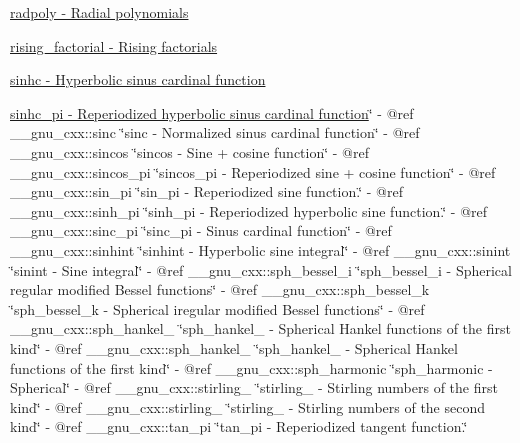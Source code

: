 \begin{DoxyItemize}
\item \hyperlink{group__gnu__math__spec__func_gac44ad9bda660a21a6b297d313f0ecf48}{radpoly -\/ Radial polynomials}
\item \hyperlink{group__gnu__math__spec__func_gad9410c6f678c673542d1b6243759ae05}{rising\+\_\+factorial -\/ Rising factorials}
\item \hyperlink{group__gnu__math__spec__func_gabafa26d8a2e592a0e080beae71ccbb7e}{sinhc -\/ Hyperbolic sinus cardinal function}
\item \hyperlink{group__gnu__math__spec__func_ga56bea42a4701761e82567f7100d9ca5e}{sinhc\+\_\+pi -\/ Reperiodized hyperbolic sinus cardinal function}\char`\"{}
-\/ @ref \+\_\+\+\_\+gnu\+\_\+cxx\+::sinc \char`\"{}sinc -\/ Normalized sinus cardinal function\char`\"{}
-\/ @ref \+\_\+\+\_\+gnu\+\_\+cxx\+::sincos \char`\"{}sincos -\/ Sine + cosine function\char`\"{}
-\/ @ref \+\_\+\+\_\+gnu\+\_\+cxx\+::sincos\+\_\+pi \char`\"{}sincos\+\_\+pi -\/ Reperiodized sine + cosine function\char`\"{}
-\/ @ref \+\_\+\+\_\+gnu\+\_\+cxx\+::sin\+\_\+pi \char`\"{}sin\+\_\+pi -\/ Reperiodized sine function.\char`\"{}
-\/ @ref \+\_\+\+\_\+gnu\+\_\+cxx\+::sinh\+\_\+pi \char`\"{}sinh\+\_\+pi -\/ Reperiodized hyperbolic sine function.\char`\"{}
-\/ @ref \+\_\+\+\_\+gnu\+\_\+cxx\+::sinc\+\_\+pi \char`\"{}sinc\+\_\+pi -\/ Sinus cardinal function\char`\"{}
-\/ @ref \+\_\+\+\_\+gnu\+\_\+cxx\+::sinhint \char`\"{}sinhint -\/ Hyperbolic sine integral\char`\"{}
-\/ @ref \+\_\+\+\_\+gnu\+\_\+cxx\+::sinint \char`\"{}sinint -\/ Sine integral\char`\"{}
-\/ @ref \+\_\+\+\_\+gnu\+\_\+cxx\+::sph\+\_\+bessel\+\_\+i \char`\"{}sph\+\_\+bessel\+\_\+i -\/ Spherical regular modified Bessel functions\char`\"{}
-\/ @ref \+\_\+\+\_\+gnu\+\_\+cxx\+::sph\+\_\+bessel\+\_\+k \char`\"{}sph\+\_\+bessel\+\_\+k -\/ Spherical iregular modified Bessel functions\char`\"{}
-\/ @ref \+\_\+\+\_\+gnu\+\_\+cxx\+::sph\+\_\+hankel\+\_ \char`\"{}sph\+\_\+hankel\+\_ -\/ Spherical Hankel functions of the first kind\char`\"{}
-\/ @ref \+\_\+\+\_\+gnu\+\_\+cxx\+::sph\+\_\+hankel\+\_ \char`\"{}sph\+\_\+hankel\+\_ -\/ Spherical Hankel functions of the first kind\char`\"{}
-\/ @ref \+\_\+\+\_\+gnu\+\_\+cxx\+::sph\+\_\+harmonic \char`\"{}sph\+\_\+harmonic -\/ Spherical\char`\"{}
-\/ @ref \+\_\+\+\_\+gnu\+\_\+cxx\+::stirling\+\_ \char`\"{}stirling\+\_ -\/ Stirling numbers of the first kind\char`\"{}
-\/ @ref \+\_\+\+\_\+gnu\+\_\+cxx\+::stirling\+\_ \char`\"{}stirling\+\_ -\/ Stirling numbers of the second kind\char`\"{}
-\/ @ref \+\_\+\+\_\+gnu\+\_\+cxx\+::tan\+\_\+pi \char`\"{}tan\+\_\+pi -\/ Reperiodized tangent function.\char`\"{}

\end{DoxyItemize}
